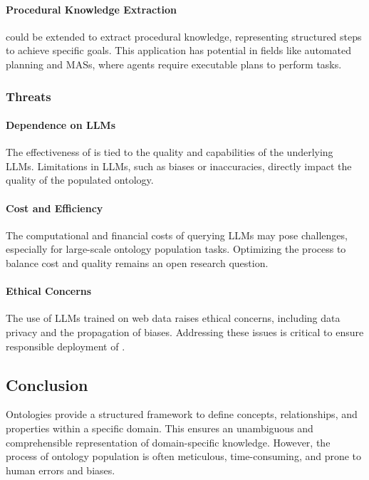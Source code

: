 \paragraph{Procedural Knowledge Extraction}
%
\llmfkg{} could be extended to extract procedural knowledge, representing structured steps to achieve specific goals.
%
This application has potential in fields like automated planning and \glspl{MAS}, where agents require executable plans to perform tasks.


\subsubsection{Threats}
\label{subsubsec:threats}
%
\paragraph{Dependence on \glspl{LLM}}
%
The effectiveness of \llmfkg{} is tied to the quality and capabilities of the underlying \glspl{LLM}.
%
Limitations in \glspl{LLM}, such as biases or inaccuracies, directly impact the quality of the populated ontology.

\paragraph{Cost and Efficiency}
%
The computational and financial costs of querying \glspl{LLM} may pose challenges, especially for large-scale ontology population tasks.
%
Optimizing the process to balance cost and quality remains an open research question.

\paragraph{Ethical Concerns}
%
The use of \glspl{LLM} trained on web data raises ethical concerns, including data privacy and the propagation of biases.
%
Addressing these issues is critical to ensure responsible deployment of \llmfkg{}.



\subsection{Conclusion}
\label{subsec:kgfiller-conclusion}
%
Ontologies provide a structured framework to define concepts, relationships, and properties within a specific domain.
%
This ensures an unambiguous and comprehensible representation of domain-specific knowledge.
%
However, the process of ontology population is often meticulous, time-consuming, and prone to human errors and biases.
%

